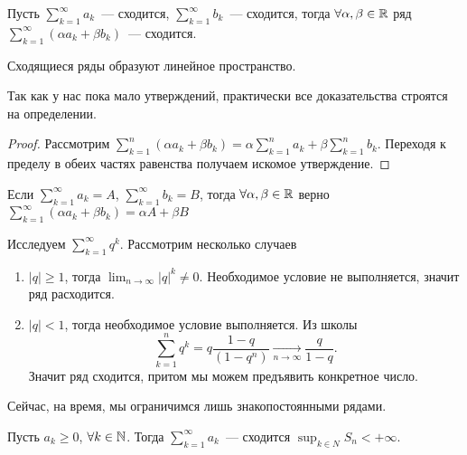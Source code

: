 \documentclass[../main.tex]{subfiles}
\begin{document}
\begin{proposition}[Линейность]
  Пусть $ \sum_{k=1}^{\infty} a_k $~--- сходится, $ \sum_{k=1}^{\infty} b_k  $~--- сходится, тогда $\forall \alpha, \beta \in \mathbb{R}$ ряд $ \sum_{k=1}^{\infty} (\alpha a_k + \beta b_k ) $~--- сходится.
\end{proposition}


\begin{note}
  Сходящиеся ряды образуют линейное пространство.
\end{note}


\begin{note}
  Так как у нас пока мало утверждений, практически все доказательства строятся на определении.
\end{note}


\begin{proof}
  Рассмотрим $ \sum_{k=1}^{n} (\alpha a_k +\beta b_k ) = \alpha \sum_{k=1}^{n} a_k + \beta \sum_{k=1}^{n} b_k $. Переходя к пределу в обеих частях равенства получаем искомое утверждение. 
\end{proof}


\begin{corollary}
  Если $ \sum_{k=1}^{\infty} a_k  = A$, $ \sum_{k=1}^{\infty} b_k = B  $, тогда $\forall \alpha, \beta \in \mathbb{R}$ верно $ \sum_{k=1}^{\infty} (\alpha a_k + \beta b_k ) = \alpha A + \beta B$ 
\end{corollary}

\begin{example}
    Исследуем $ \sum_{k=1}^{\infty} q^{k} $. Рассмотрим несколько случаев \begin{enumerate}
      \item $ \left| q \right| \geq 1$, тогда $ \lim_{n \to \infty} \left| q \right| ^{k} \neq 0$. Необходимое условие не выполняется, значит ряд расходится.
      \item $ \left| q \right| < 1$, тогда необходимое условие выполняется. Из школы $$ \sum_{k=1}^{n} q^{k} = q \frac{1-q}{(1-q^{n})}  \xrightarrow[n \to  \infty ]{} \frac{q}{1-q} .$$ Значит ряд сходится, притом мы можем предъявить конкретное число. 
    \end{enumerate}
\end{example}


\begin{note}
  Сейчас, на время, мы ограничимся лишь знакопостоянными рядами. 
\end{note}


\begin{proposition}
  Пусть $a_k \geq 0$, $\forall k \in \mathbb{N}$. Тогда $ \sum_{k=1}^{\infty} a_k $~--- сходится \nas $\sup_{k \in N} S_{n} < + \infty$. 
\end{proposition}
\end{document}
